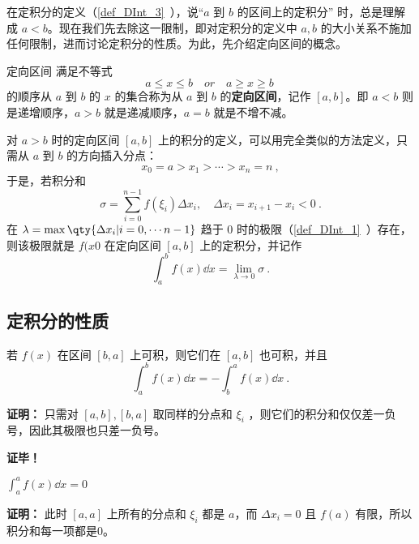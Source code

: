 
在定积分的定义（\autoref{def_DInt_3}~），说“$a$ 到 $b$ 的区间上的定积分” 时，总是理解成 $a<b$。现在我们先去除这一限制，即对定积分的定义中 $a,b$ 的大小关系不施加任何限制，进而讨论定积分的性质。为此，先介绍定向区间的概念。

\begin{definition}{定向区间}
满足不等式
\begin{equation}
a\leq x\leq b\quad or\quad a\geq x\geq b~
\end{equation}
的顺序从 $a$ 到 $b$ 的 $x$ 的集合称为从 $a$ 到 $b$ 的\textbf{定向区间}，记作 $[a,b]$。即 $a<b$ 则是递增顺序，$a>b$ 就是递减顺序，$a=b$ 就是不增不减。
\end{definition}
对 $a>b$ 时的定向区间 $[a,b]$ 上的积分的定义，可以用完全类似的方法定义，只需从 $a$ 到 $b$ 的方向插入分点：
\begin{equation}
x_0=a>x_1>\cdots>x_n=n~,
\end{equation}
于是，若积分和
\begin{equation}
\sigma=\sum_{i=0}^{n-1}f(\xi_i)\Delta x_i,\quad\Delta x_i=x_{i+1}-x_i<0~.
\end{equation}
在 $\lambda=\max\qty{\Delta x_i|i=0,\cdots n-1}$ 趋于 0 时的极限（\autoref{def_DInt_1}~）存在，则该极限就是 $f(x0$ 在定向区间 $[a,b]$ 上的定积分，并记作
\begin{equation}
\int_a^b f(x)\dd x=\lim_{\lambda\rightarrow0}\sigma~.
\end{equation}

\subsection{定积分的性质}
\begin{theorem}{}\label{the_DIntP_2}
若 $f(x)$ 在区间 $[b,a]$ 上可积，则它们在 $[a,b]$ 也可积，并且
\begin{equation}
\int_a^b f(x)\dd x=-\int_b^a f(x)\dd x~.
\end{equation}
\end{theorem} 

\textbf{证明：}
只需对 $[a,b],[b,a]$ 取同样的分点和 $\xi_i$ ，则它们的积分和仅仅差一负号，因此其极限也只差一负号。

\textbf{证毕！}
\begin{theorem}{}\label{the_DIntP_1}
$\int_a^a f(x)\dd x=0$
\end{theorem}
\textbf{证明：}
此时 $[a,a]$ 上所有的分点和 $\xi_i$ 都是 $a$，而 $\Delta x_i=0$ 且 $f(a)$ 有限，所以积分和每一项都是0。

